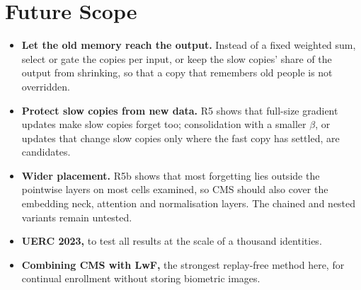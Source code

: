 \documentclass[12pt,a4paper]{report}
\begin{document}
\section{Future Scope}
\begin{itemize}
\item \textbf{Let the old memory reach the output.} Instead of a fixed weighted sum, select or gate the copies per input, or keep the slow copies' share of the output from shrinking, so that a copy that remembers old people is not overridden.
\item \textbf{Protect slow copies from new data.} R5 shows that full-size gradient updates make slow copies forget too; consolidation with a smaller $\beta$, or updates that change slow copies only where the fast copy has settled, are candidates.
\item \textbf{Wider placement.} R5b shows that most forgetting lies outside the pointwise layers on most cells examined, so CMS should also cover the embedding neck, attention and normalisation layers. The chained and nested variants remain untested.
\item \textbf{UERC 2023,} to test all results at the scale of a thousand identities.
\item \textbf{Combining CMS with LwF,} the strongest replay-free method here, for continual enrollment without storing biometric images.
\end{itemize}
\end{document}
